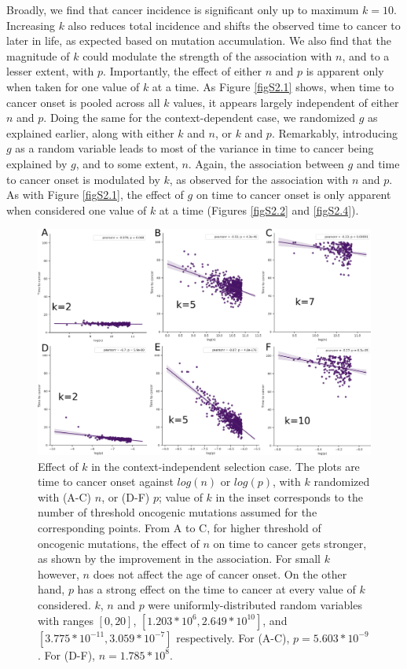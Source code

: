 \documentclass[9pt,twocolumn,twoside]{pnas-new}
\begin{document}
		Broadly, we find that cancer incidence is significant only up to maximum $k=10$. Increasing $k$ also reduces total incidence and shifts the observed time to cancer to later in life, as expected based on mutation accumulation. We also find that the magnitude of $k$ could modulate the strength of the association with $n$, and to a lesser extent, with $p$. Importantly, the effect of either $n$ and $p$ is apparent only when taken for one value of $k$ at a time. As Figure \ref{figS2.1} shows, when time to cancer onset is pooled across all $k$ values, it appears largely independent of either $n$ and $p$.
		Doing the same for the context-dependent case, we randomized $g$ as explained earlier, along with either $k$ and $n$, or $k$ and $p$. Remarkably, introducing $g$ as a random variable leads to most of the variance in time to cancer being explained by $g$, and to some extent, $n$. Again, the association between $g$ and time to cancer onset is modulated by $k$, as observed for the association with $n$ and $p$. As with Figure \ref{figS2.1}, the effect of $g$ on time to cancer onset is only apparent when considered one value of $k$ at a time (Figures \ref{figS2.2} and \ref{figS2.4}).

		\begin{figure}[tbhp]
			\centering
			\includegraphics[width=\linewidth, keepaspectratio=true]{figS2-3.png}
			\caption{Effect of $k$ in the context-independent selection case. The plots are time to cancer onset against $log(n)$ or $log(p)$, with $k$ randomized with (A-C) $n$, or (D-F) $p$; value of $k$ in the inset corresponds to the number of threshold oncogenic mutations assumed for the corresponding points. From A to C, for higher threshold of oncogenic mutations, the effect of $n$ on time to cancer gets stronger, as shown by the improvement in the association. For small $k$ however, $n$ does not affect the age of cancer onset. On the other hand, $p$ has a strong effect on the time to cancer at every value of $k$ considered. $k$, $n$ and $p$ were uniformly-distributed random variables with ranges $[0, 20]$, $[1.203*10^{6}, 2.649*10^{10}]$, and $[3.775*10^{-11}, 3.059*10^{-7}]$ respectively. For (A-C), $p=5.603*10^{-9}$. For (D-F), $n=1.785*10^{8}$.}
			\label{figS2.3}
		\end{figure}
\end{document}
